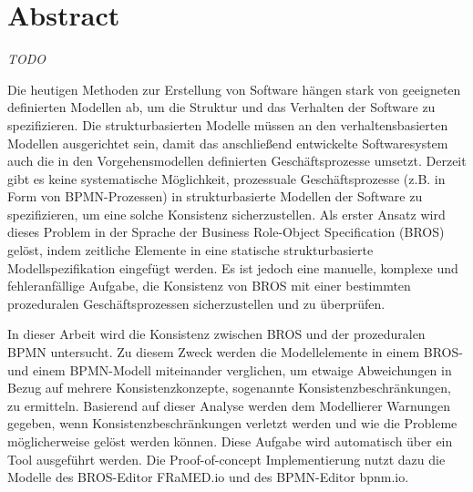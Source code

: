 \chapter*{Abstract}

\textit{TODO}
\vspace{10pt}

Die heutigen Methoden zur Erstellung von Software hängen stark von geeigneten definierten Modellen ab, um die Struktur und das Verhalten der Software zu spezifizieren.
Die strukturbasierten Modelle müssen an den verhaltensbasierten Modellen ausgerichtet sein, damit das anschließend entwickelte Softwaresystem auch die in den Vorgehensmodellen definierten Geschäftsprozesse umsetzt.
Derzeit gibt es keine systematische Möglichkeit, prozessuale Geschäftsprozesse (z.B. in Form von BPMN-Prozessen) in strukturbasierte Modellen der Software zu spezifizieren, um eine solche Konsistenz sicherzustellen.
Als erster Ansatz wird dieses Problem in der Sprache der Business Role-Object Specification (BROS) gelöst, indem zeitliche Elemente in eine statische strukturbasierte Modellspezifikation eingefügt werden.
Es ist jedoch eine manuelle, komplexe und fehleranfällige Aufgabe, die Konsistenz von BROS mit einer bestimmten prozeduralen Geschäftsprozessen sicherzustellen und zu überprüfen.

In dieser Arbeit wird die Konsistenz zwischen BROS und der prozeduralen BPMN untersucht.
Zu diesem Zweck werden die Modellelemente in einem BROS- und einem BPMN-Modell miteinander verglichen, um etwaige Abweichungen in Bezug auf mehrere Konsistenzkonzepte, sogenannte Konsistenzbeschränkungen, zu ermitteln.
Basierend auf dieser Analyse werden dem Modellierer Warnungen gegeben, wenn Konsistenzbeschränkungen verletzt werden und wie die Probleme möglicherweise gelöst werden können.
Diese Aufgabe wird automatisch über ein Tool ausgeführt werden. Die Proof-of-concept Implementierung nutzt dazu die Modelle des BROS-Editor FRaMED.io und des BPMN-Editor bpnm.io.
